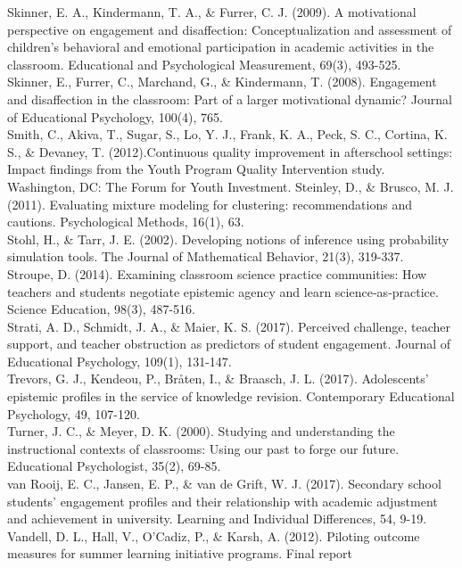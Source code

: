 \documentclass[]{msu-thesis}
\theoremstyle{definition}
\theoremstyle{definition}
\theoremstyle{definition}
\theoremstyle{remark}
\begin{document}
Skinner, E. A., Kindermann, T. A., \& Furrer, C. J. (2009). A
motivational perspective on engagement and disaffection:
Conceptualization and assessment of children's behavioral and emotional
participation in academic activities in the classroom. Educational and
Psychological Measurement, 69(3), 493-525.\\
Skinner, E., Furrer, C., Marchand, G., \& Kindermann, T. (2008).
Engagement and disaffection in the classroom: Part of a larger
motivational dynamic? Journal of Educational Psychology, 100(4), 765.\\
Smith, C., Akiva, T., Sugar, S., Lo, Y. J., Frank, K. A., Peck, S. C.,
Cortina, K. S., \& Devaney, T. (2012).Continuous quality improvement in
afterschool settings: Impact findings from the Youth Program Quality
Intervention study. Washington, DC: The Forum for Youth Investment.
Steinley, D., \& Brusco, M. J. (2011). Evaluating mixture modeling for
clustering: recommendations and cautions. Psychological Methods, 16(1),
63.\\
Stohl, H., \& Tarr, J. E. (2002). Developing notions of inference using
probability simulation tools. The Journal of Mathematical Behavior,
21(3), 319-337.\\
Stroupe, D. (2014). Examining classroom science practice communities:
How teachers and students negotiate epistemic agency and learn
science‐as‐practice. Science Education, 98(3), 487-516.\\
Strati, A. D., Schmidt, J. A., \& Maier, K. S. (2017). Perceived
challenge, teacher support, and teacher obstruction as predictors of
student engagement. Journal of Educational Psychology, 109(1),
131-147.\\
Trevors, G. J., Kendeou, P., Bråten, I., \& Braasch, J. L. (2017).
Adolescents' epistemic profiles in the service of knowledge revision.
Contemporary Educational Psychology, 49, 107-120.\\
Turner, J. C., \& Meyer, D. K. (2000). Studying and understanding the
instructional contexts of classrooms: Using our past to forge our
future. Educational Psychologist, 35(2), 69-85.\\
van Rooij, E. C., Jansen, E. P., \& van de Grift, W. J. (2017).
Secondary school students' engagement profiles and their relationship
with academic adjustment and achievement in university. Learning and
Individual Differences, 54, 9-19.\\
Vandell, D. L., Hall, V., O'Cadiz, P., \& Karsh, A. (2012). Piloting
outcome measures for summer learning initiative programs. Final report
\end{document}
